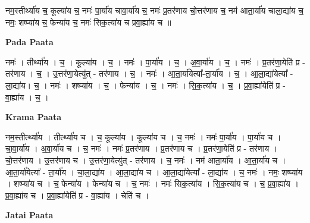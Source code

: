 \documentclass[17pt]{extarticle}
\begin{document}
नम॒स्तीर्थ्या॑य च॒ कूल्या॑य च॒ नमः॑ पा॒र्या॑य चावा॒र्या॑य च॒ नमः॑ प्र॒तर॑णाय चो॒त्तर॑णाय च॒ नम॑ आता॒र्या॑य चाला॒द्या॑य च॒ नमः॒ शष्प्या॑य च॒ फेन्या॑य च॒ नमः॑ सिक॒त्या॑य च प्रवा॒ह्या॑य च ॥ \newline

\textbf{Pada Paata} \newline

नमः॑ । तीर्थ्या॑य । च॒ । कूल्या॑य । च॒ । नमः॑ । पा॒र्या॑य । च॒ । अ॒वा॒र्या॑य । च॒ । नमः॑ । प्र॒तर॑णा॒येति॑ प्र - तर॑णाय । च॒ । उ॒त्तर॑णा॒येत्यु॑त् - तर॑णाय । च॒ । नमः॑ । आ॒ता॒र्या॑येत्या᳚-ता॒र्या॑य । च॒ । आ॒ला॒द्या॑येत्या᳚ - ला॒द्या॑य। च॒ । नमः॑ । शष्प्या॑य । च॒ । फेन्या॑य । च॒ । नमः॑ । सि॒क॒त्या॑य । च॒ । प्र॒वा॒ह्या॑येति॑ प्र - वा॒ह्या॑य । च॒ ।  \newline


\textbf{Krama Paata} \newline

नम॒स्तीर्त्थ्या॑य । तीर्त्थ्या॑य च । च॒ कूल्या॑य । कूल्या॑य च । च॒ नमः॑ । नमः॑ पा॒र्या॑य । पा॒र्या॑य च । चा॒वा॒र्या॑य । अ॒वा॒र्या॑य च । च॒ नमः॑ । नमः॑ प्र॒तर॑णाय । प्र॒तर॑णाय च । प्र॒तर॑णा॒येति॑ प्र - तर॑णाय । चो॒त्तर॑णाय । उ॒त्तर॑णाय च । उ॒त्तर॑णा॒येत्यु॑त् - तर॑णाय । च॒ नमः॑ । नम॑ आता॒र्या॑य । आ॒ता॒र्या॑य च । आ॒ता॒र्या॑येत्या᳚ - ता॒र्या॑य । चा॒ला॒द्या॑य । आ॒ला॒द्या॑य च । आ॒ला॒द्या॑येत्या᳚ - ला॒द्या॑य । च॒ नमः॑ । नमः॒ शष्प्या॑य । शष्प्या॑य च । च॒ फेन्या॑य । फेन्या॑य च । च॒ नमः॑ । नमः॑ सिक॒त्या॑य । सि॒क॒त्या॑य च । च॒ प्र॒वा॒ह्या॑य । प्र॒वा॒ह्या॑य च । प्र॒वा॒ह्या॑येति॑ प्र - वा॒ह्या॑य । चेति॑ च । \newline

\textbf{Jatai Paata} \newline
\end{document}
